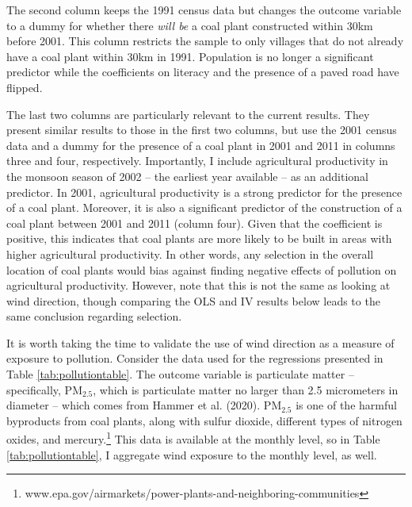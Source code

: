 \documentclass[
]{article}
\begin{document}
The second column keeps the 1991 census data but changes the outcome variable to a dummy for whether there \emph{will be} a coal plant constructed within 30km before 2001. This column restricts the sample to only villages that do not already have a coal plant within 30km in 1991. Population is no longer a significant predictor while the coefficients on literacy and the presence of a paved road have flipped.

The last two columns are particularly relevant to the current results. They present similar results to those in the first two columns, but use the 2001 census data and a dummy for the presence of a coal plant in 2001 and 2011 in columns three and four, respectively. Importantly, I include agricultural productivity in the monsoon season of 2002 -- the earliest year available -- as an additional predictor. In 2001, agricultural productivity is a strong predictor for the presence of a coal plant. Moreover, it is also a significant predictor of the construction of a coal plant between 2001 and 2011 (column four). Given that the coefficient is positive, this indicates that coal plants are more likely to be built in areas with higher agricultural productivity. In other words, any selection in the overall location of coal plants would bias against finding negative effects of pollution on agricultural productivity. However, note that this is not the same as looking at wind direction, though comparing the OLS and IV results below leads to the same conclusion regarding selection.

It is worth taking the time to validate the use of wind direction as a measure of exposure to pollution. Consider the data used for the regressions presented in Table \ref{tab:pollutiontable}. The outcome variable is particulate matter -- specifically, \(\mathrm{PM_{2.5}}\), which is particulate matter no larger than 2.5 micrometers in diameter -- which comes from Hammer et al. (2020). \(\mathrm{PM_{2.5}}\) is one of the harmful byproducts from coal plants, along with sulfur dioxide, different types of nitrogen oxides, and mercury.\footnote{www.epa.gov/airmarkets/power-plants-and-neighboring-communities} This data is available at the monthly level, so in Table \ref{tab:pollutiontable}, I aggregate wind exposure to the monthly level, as well.
\end{document}
